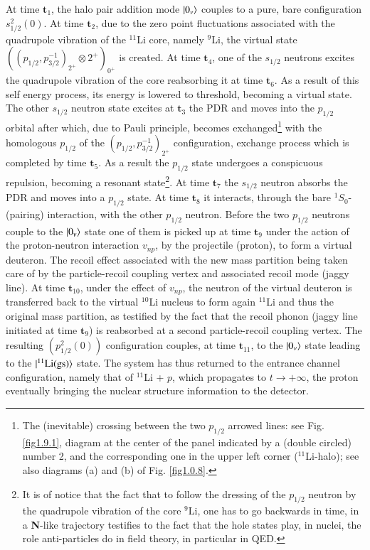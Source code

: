  At time $\mathbf{t}_1$, the halo pair addition mode $|{0_\nu} \rangle$ couples to a pure, bare configuration $s_{1/2}^2(0)$. At time $\mathbf{t}_2$,  due to the zero point fluctuations associated with the quadrupole vibration of the $^{11}$Li core, namely $^9$Li, the virtual state $((p_{1/2},p_{3/2}^{-1})_{2^+}\otimes 2^+)_{0^+}$ is created. At time $\mathbf{t}_4$, one of the  $s_{1/2}$ neutrons excites the quadrupole vibration of the core reabsorbing it at time $\mathbf{t}_6$. As a result of this self energy process, its energy is lowered to threshold, becoming a virtual state. The other $s_{1/2}$  neutron state excites at $\mathbf{t}_3$ the PDR and moves into the $p_{1/2}$ orbital after which,  due to Pauli principle, becomes exchanged\footnote{The (inevitable) crossing between the two $p_{1/2}$ arrowed lines: see Fig. \ref{fig1.9.1},  diagram at the center of the panel indicated by a (double circled) number 2, and the corresponding one in the upper left corner ($^{11}$Li-halo); see also diagrams (a) and (b) of Fig. \ref{fig1.0.8}.} with the homologous $p_{1/2}$ of the $(p_{1/2},p_{3/2}^{-1})_{2^+}$
configuration, exchange process which is completed by time $\mathbf{t}_5$. As a result the $p_{1/2}$ state undergoes a conspicuous repulsion, becoming a resonant state\footnote{It is of notice that the fact that to follow the dressing of the $p_{1/2}$ neutron by the quadrupole vibration of the core $^9$Li, one has to go backwards in time, in a \textbf{N}-like trajectory testifies to the fact that the hole states play, in nuclei, the role  anti-particles do in field theory, in particular in QED. }. At time $\mathbf{t}_7$ the $s_{1/2}$ neutron absorbs the PDR and moves into a $p_{1/2}$ state. At time $\mathbf{t}_8$ it interacts, through the bare $^1S_0$-(pairing) interaction, with the other $p_{1/2}$ neutron. Before the two $p_{1/2}$ neutrons couple to the $|{0_\nu} \rangle$ state one of them is picked up at time $\mathbf{t}_9$ under the action of the proton-neutron interaction $v_{np}$, by the projectile (proton), to form a virtual deuteron. The recoil effect associated with the new mass partition being taken care of by the particle-recoil coupling vertex and associated recoil mode (jaggy line). At time $\mathbf{t}_{10}$,  under the effect of $v_{np}$, the neutron of the virtual deuteron is transferred back to the virtual $^{10}$Li nucleus to form again $^{11}$Li and thus the original mass partition, as testified by the fact that the recoil phonon (jaggy line initiated at time $\mathbf{t}_9$) is reabsorbed at a second particle-recoil coupling vertex. The resulting $(p^2_{1/2}(0))$ configuration couples, at time $\mathbf{t}_{11}$, to the $|{0_\nu} \rangle$ state leading to the $|{^{11}\text{Li(gs)}} \rangle$ state. The system has thus returned to the entrance channel configuration, namely that of $^{11}$Li + $p$, which propagates to $t\to+\infty$, the proton eventually bringing the nuclear structure information to the detector.


